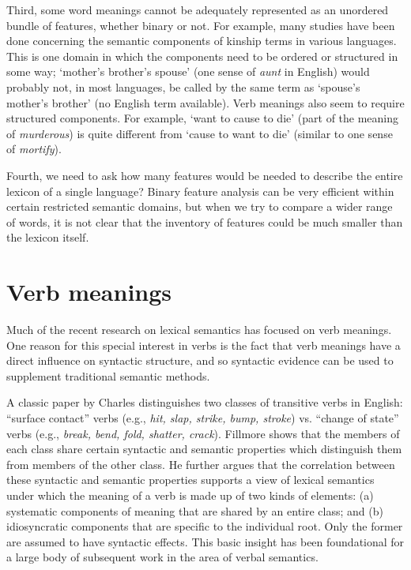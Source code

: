 Third, some word meanings cannot be adequately represented as an unordered bundle of features, whether binary or not. For example, many studies have been done concerning the semantic components of kinship terms in various languages. This is one domain in which the components need to be ordered or structured in some way; ‘mother’s brother’s spouse’ (one sense of \textit{aunt} in English) would probably not, in most languages, be called by the same term as ‘spouse’s mother’s brother’ (no English term available). Verb meanings also seem to require structured components. For example, ‘want to cause to die’ (part of the meaning of \textit{murderous}) is quite different from ‘cause to want to die’ (similar to one sense of \textit{mortify}).



Fourth, we need to ask how many features would be needed to describe the entire lexicon of a single language? Binary feature analysis can be very efficient within certain restricted semantic domains, but when we try to compare a wider range of words, it is not clear that the inventory of features could be much smaller than the lexicon itself.


\section{Verb meanings}\label{sec:7.5}

Much of the recent research on lexical semantics has focused on verb meanings. One reason for this special interest in verbs is the fact that verb meanings have a direct influence on syntactic structure, and so syntactic evidence can be used to supplement traditional semantic methods.



A classic paper by Charles \citet{Fillmore1970} distinguishes two classes of transitive verbs in English: “surface contact” verbs (e.g., \textit{hit, slap, strike, bump, stroke}) vs. “change of state” verbs (e.g., \textit{break, bend, fold, shatter, crack}). Fillmore shows that the members of each class share certain syntactic and semantic properties which distinguish them from members of the other class. He further argues that the correlation between these syntactic and semantic properties supports a view of lexical semantics under which the meaning of a verb is made up of two kinds of elements: (a) systematic components of meaning that are shared by an entire class; and (b) idiosyncratic components that are specific to the individual root. Only the former are assumed to have syntactic effects. This basic insight has been foundational for a large body of subsequent work in the area of verbal semantics.



